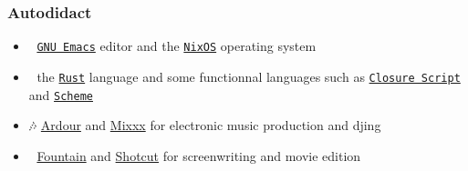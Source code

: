 \documentclass[11pt]{article}
\begin{document}
\subsubsection{Autodidact}
\label{sec:orgef7dfbd}
\begin{itemize}
\item 🐄 \href{https://www.gnu.org/software/emacs/}{\texttt{GNU Emacs}} editor and the \href{https://nixos.org/}{\texttt{NixOS}} operating system
\item 🦀 the \href{https://www.rust-lang.org/}{\texttt{Rust}} language and some functionnal languages such as \href{https://clojurescript.org/}{\texttt{Closure Script}} and \href{http://www.call-cc.org/}{\texttt{Scheme}}
\item 🎶 \href{https://ardour.org/}{Ardour} and \href{https://mixxx.org/}{Mixxx} for electronic music production and djing
\item 🎥 \href{https://fountain.io/}{Fountain} and \href{https://www.shotcut.org/}{Shotcut} for screenwriting and movie edition
\end{itemize}
\end{document}
